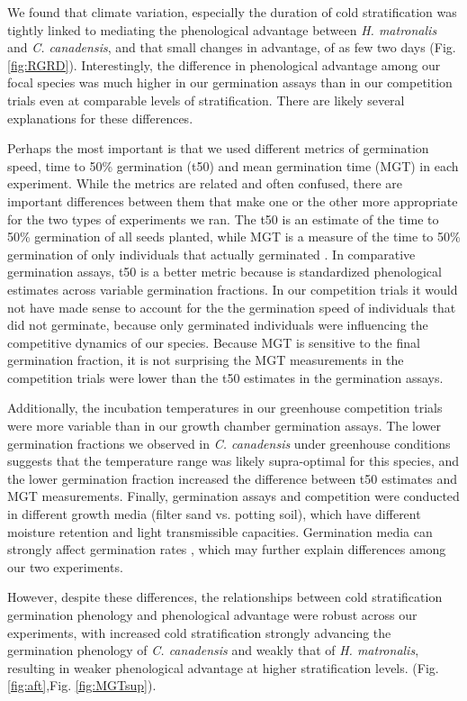 \documentclass{article}\usepackage[]{graphicx}\usepackage[]{color}
\begin{document}
We found that climate variation, especially the duration of cold stratification was tightly linked to mediating the phenological advantage between \textit{H. matronalis} and \textit{C. canadensis}, and that small changes in advantage, of as few two days (Fig. \ref{fig:RGRD}). Interestingly, the difference in phenological advantage among our focal species was much higher in our germination assays than in our competition trials even at comparable levels of stratification. There are likely several explanations for these differences.

Perhaps the most important is that we used different metrics of germination speed, time to 50\% germination (t50) and mean germination time (MGT) in each experiment. While the metrics are related and often confused, there are important differences between them that make one or the other more appropriate for the two types of experiments we ran. The t50 is an estimate of the time to 50\% germination of all seeds planted, while MGT is a measure of the time to 50\% germination of only individuals that actually germinated \citep{Soltani:2015aa}. In comparative germination assays, t50 is a better metric because is standardized phenological estimates across variable germination fractions. In our competition trials it would not have made sense to account for the the germination speed of individuals that did not germinate, because only germinated individuals were influencing the competitive dynamics of our species. Because MGT is sensitive to the final germination fraction, it is not surprising the MGT measurements in the competition trials  were lower than the t50 estimates in the germination assays.

Additionally, the incubation temperatures in our greenhouse competition trials were more variable than in our growth chamber germination  assays. The lower germination fractions we observed in \textit{C. canadensis} under greenhouse conditions suggests that the temperature range was likely supra-optimal for this species, and the lower germination fraction increased the difference between t50 estimates and MGT measurements. Finally, germination assays and competition were conducted in different growth media (filter sand vs. potting soil), which have different moisture retention and light transmissible  capacities. Germination media can strongly affect germination rates \citep{}, which may further explain differences among our two experiments.

However, despite these differences, the relationships between cold stratification germination phenology and phenological advantage were robust across our experiments, with increased cold stratification strongly advancing the germination phenology of \textit{C. canadensis} and weakly that of \textit{H. matronalis}, resulting in weaker phenological advantage at higher stratification levels. (Fig. \ref{fig:aft},Fig. \ref{fig:MGTsup}).
\end{document}
